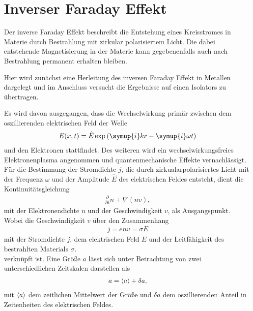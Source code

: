 \section{Inverser Faraday Effekt}
Der inverse Faraday Effekt beschreibt die Entstehung eines Kreisstromes
in Materie durch Bestrahlung mit zirkular polarisiertem Licht.
Die dabei entstehende Magnetisierung in der Materie kann gegebenenfalls
auch nach Bestrahlung permanent erhalten bleiben.

Hier wird zunächst eine Herleitung des inversen Faraday Effekt in Metallen
dargelegt und im Anschluss versucht die Ergebnisse auf einen Isolators
zu übertragen.

Es wird davon ausgegangen, dass die Wechselwirkung primär zwischen dem
oszillierenden elektrischen Feld der Welle
\begin{align}
  E(x,t)=\hat{E}\exp{\left(\symup{i}kr-\symup{i}\omega t\right)}
\end{align}
und den Elektronen stattfindet.
Des weiteren wird ein wechselwirkungsfreies Elektronenplasma angenommen und quantenmechanische Effekte vernachlässigt.
Für die Bestimmung der Stromdichte $j$,
die durch zirkualarpolarisiertes Licht mit der Frequenz $\omega$ und
der Amplitude $\hat{E}$ des elektrischen Feldes entsteht, dient die Kontinuitätsgleichung
\begin{align}
  \frac{\partial}{\partial t}n +\nabla(nv), \label{eqn:konti}
\end{align}
mit der Elektronendichte $n$ und der Geschwindigkeit $v$,
als Ausgangspunkt.
Wobei die Geschwindigkeit $v$ über den Zusammenhang
\begin{align}
  j=env=\sigma E
\end{align}
mit der Stromdichte $j$, dem elektrischen Feld $E$ und
der Leitfähigkeit des bestrahlten Materials $\sigma$.\\
verknüpft ist.
Eine Größe $a$ lässt sich unter Betrachtung von zwei unterschiedlichen Zeitskalen darstellen als
\begin{align}
  a=\braket{a}+\delta a,
\end{align}
mit $\braket{a}$ dem zeitlichen Mittelwert der Größe und
$\delta a$ dem oszillierenden Anteil in Zeitenheiten des elektrischen Feldes.

